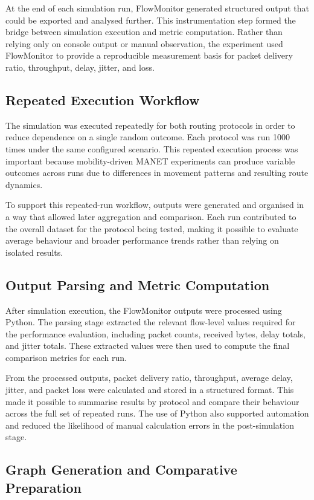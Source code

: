 \documentclass{Academic}
\begin{document}
At the end of each simulation run, FlowMonitor generated structured output that could be exported and analysed further. This instrumentation step formed the bridge between simulation execution and metric computation. Rather than relying only on console output or manual observation, the experiment used FlowMonitor to provide a reproducible measurement basis for packet delivery ratio, throughput, delay, jitter, and loss.

\subsection{Repeated Execution Workflow}

The simulation was executed repeatedly for both routing protocols in order to reduce dependence on a single random outcome. Each protocol was run 1000 times under the same configured scenario. This repeated execution process was important because mobility-driven MANET experiments can produce variable outcomes across runs due to differences in movement patterns and resulting route dynamics.

To support this repeated-run workflow, outputs were generated and organised in a way that allowed later aggregation and comparison. Each run contributed to the overall dataset for the protocol being tested, making it possible to evaluate average behaviour and broader performance trends rather than relying on isolated results.

\subsection{Output Parsing and Metric Computation}

After simulation execution, the FlowMonitor outputs were processed using Python. The parsing stage extracted the relevant flow-level values required for the performance evaluation, including packet counts, received bytes, delay totals, and jitter totals. These extracted values were then used to compute the final comparison metrics for each run.

From the processed outputs, packet delivery ratio, throughput, average delay, jitter, and packet loss were calculated and stored in a structured format. This made it possible to summarise results by protocol and compare their behaviour across the full set of repeated runs. The use of Python also supported automation and reduced the likelihood of manual calculation errors in the post-simulation stage.

\subsection{Graph Generation and Comparative Preparation}
\end{document}
